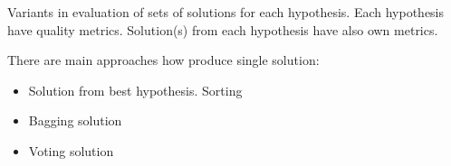     Variants in evaluation of sets of solutions for each hypothesis.
    Each hypothesis have quality metrics. Solution(s) from each hypothesis have also own metrics.

    There are main approaches how produce single solution: 
    \begin{itemize}
        \item Solution from best hypothesis. Sorting
        \item Bagging solution
        \item Voting solution                
    \end{itemize}